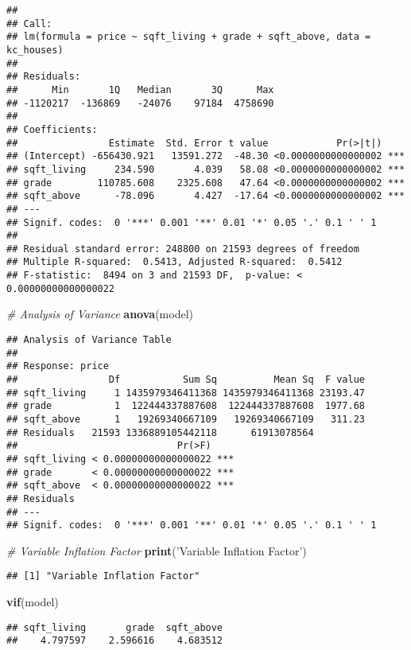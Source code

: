 \documentclass[]{article}
\newenvironment{Shaded}{\begin{snugshade}}{\end{snugshade}}
\newcommand{\CommentTok}[1]{\textcolor[rgb]{0.56,0.35,0.01}{\textit{#1}}}
\newcommand{\KeywordTok}[1]{\textcolor[rgb]{0.13,0.29,0.53}{\textbf{#1}}}
\newcommand{\NormalTok}[1]{#1}
\newcommand{\StringTok}[1]{\textcolor[rgb]{0.31,0.60,0.02}{#1}}
\begin{document}
\begin{verbatim}
## 
## Call:
## lm(formula = price ~ sqft_living + grade + sqft_above, data = kc_houses)
## 
## Residuals:
##      Min       1Q   Median       3Q      Max 
## -1120217  -136869   -24076    97184  4758690 
## 
## Coefficients:
##                Estimate  Std. Error t value            Pr(>|t|)    
## (Intercept) -656430.921   13591.272  -48.30 <0.0000000000000002 ***
## sqft_living     234.590       4.039   58.08 <0.0000000000000002 ***
## grade        110785.608    2325.608   47.64 <0.0000000000000002 ***
## sqft_above      -78.096       4.427  -17.64 <0.0000000000000002 ***
## ---
## Signif. codes:  0 '***' 0.001 '**' 0.01 '*' 0.05 '.' 0.1 ' ' 1
## 
## Residual standard error: 248800 on 21593 degrees of freedom
## Multiple R-squared:  0.5413, Adjusted R-squared:  0.5412 
## F-statistic:  8494 on 3 and 21593 DF,  p-value: < 0.00000000000000022
\end{verbatim}

\begin{Shaded}
\begin{Highlighting}[]
\CommentTok{# Analysis of Variance}
\KeywordTok{anova}\NormalTok{(model)}
\end{Highlighting}
\end{Shaded}

\begin{verbatim}
## Analysis of Variance Table
## 
## Response: price
##                Df           Sum Sq          Mean Sq  F value
## sqft_living     1 1435979346411368 1435979346411368 23193.47
## grade           1  122444337887608  122444337887608  1977.68
## sqft_above      1   19269340667109   19269340667109   311.23
## Residuals   21593 1336889105442118      61913078564         
##                            Pr(>F)    
## sqft_living < 0.00000000000000022 ***
## grade       < 0.00000000000000022 ***
## sqft_above  < 0.00000000000000022 ***
## Residuals                            
## ---
## Signif. codes:  0 '***' 0.001 '**' 0.01 '*' 0.05 '.' 0.1 ' ' 1
\end{verbatim}

\begin{Shaded}
\begin{Highlighting}[]
\CommentTok{# Variable Inflation Factor}
\KeywordTok{print}\NormalTok{(}\StringTok{'Variable Inflation Factor'}\NormalTok{)}
\end{Highlighting}
\end{Shaded}

\begin{verbatim}
## [1] "Variable Inflation Factor"
\end{verbatim}

\begin{Shaded}
\begin{Highlighting}[]
\KeywordTok{vif}\NormalTok{(model)}
\end{Highlighting}
\end{Shaded}

\begin{verbatim}
## sqft_living       grade  sqft_above 
##    4.797597    2.596616    4.683512
\end{verbatim}
\end{document}
